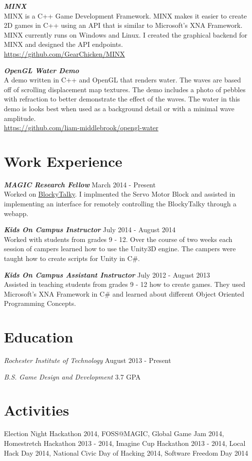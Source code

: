 \documentclass[line,margin]{res}
\begin{document}
\begin{resume}
{\textbf{\emph{MINX}}}\\
MINX is a C++ Game Development Framework. MINX makes it easier to create 2D games in C++ using an API
that is similar to Microsoft's XNA Framework. MINX currently runs on Windows and Linux. I created the
graphical backend for MINX and designed the API endpoints.\\
\url{https://github.com/GearChicken/MINX}

{\textbf{\emph{OpenGL Water Demo}}}\\
A demo written in C++ and OpenGL that renders water. The waves are based off of scrolling displacement
map textures. The demo includes a photo of pebbles with refraction to better demonstrate the effect
of the waves. The water in this demo is looks best when used as a background detail or with a minimal
wave amplitude.\\
\url{https://github.com/liam-middlebrook/opengl-water}


\section{Work Experience}

{\textbf{\emph{MAGIC Research Fellow}}} \hfill March 2014 - Present\\
Worked on \href{https://github.com/liam-middlebrook/blockytalky.git}{BlockyTalky}. I implmented
the Servo Motor Block and assisted in implementing an interface for remotely controlling the 
BlockyTalky through a webapp.

{\textbf{\emph{Kids On Campus Instructor}}} \hfill July 2014 - August 2014\\
Worked with students from grades 9 - 12. Over the course of two weeks each session of campers
learned how to use the Unity3D engine. The campers were taught how to create scripts for Unity
in C\#.

{\textbf{\emph{Kids On Campus Assistant Instructor}}} \hfill July 2012 - August 2013\\
Assisted in teaching students from grades 9 - 12 how to create games. They used Microsoft's 
XNA Framework in C\# and learned about different Object Oriented Programming Concepts.


\section{Education}
{\sl Rochester Institute of Technology} \hfill August 2013 - Present

{\sl B.S. Game Design and Development} \hfill 3.7 GPA 


\section{Activities}
Election Night Hackathon 2014, FOSS@MAGIC, Global Game Jam 2014,
Homestretch Hackathon 2013 - 2014, Imagine Cup Hackathon 2013 - 2014,
Local Hack Day 2014, National Civic Day of Hacking 2014, Software Freedom Day 2014



\end{resume}
\end{document}
